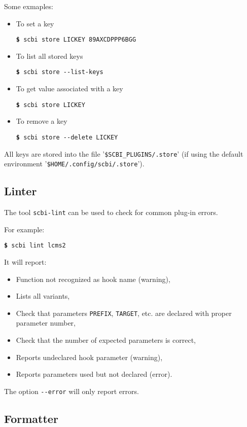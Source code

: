 \documentclass[a4paper,12pt,twoside]{article}
\newcommand{\code}[1]{\texttt{#1}}
\newcommand{\file}[1]{'{\texttt{#1}}'}
\newcommand{\cmd}[1]{\tabto{1cm}\hspace{0.5cm}\texttt{\textbf{\$} #1}}
\newcommand{\ddash}{-{}-}
\begin{document}
Some exmaples:

\begin{itemize}
	\item To set a key

	\cmd{scbi store LICKEY 89AXCDPPP6BGG}

	\item To list all stored keys

	\cmd{scbi store \ddash{}list-keys}

	\item To get value associated with a key

	\cmd{scbi store LICKEY}

	\item To remove a key

    \cmd{scbi store \ddash{}delete LICKEY}
\end{itemize}

All keys are stored into the file \file{\$SCBI\_PLUGINS/.store} (if using the default environment \file{\$HOME/.config/scbi/.store}).

\subsection{Linter}
\label{linter}

The tool \code{scbi-lint} can be used to check for common plug-in errors.

For example:

\cmd{scbi lint lcms2}

It will report:

\begin{itemize}
	\item Function not recognized as hook name (warning),
	\item Lists all variants,
	\item Check that parameters \code{PREFIX}, \code{TARGET}, etc. are declared with proper parameter number,
	\item Check that the number of expected parameters is correct,
	\item Reports undeclared hook parameter (warning),
	\item Reports parameters used but not declared (error).
\end{itemize}

The option \code{\ddash{}error} will only report errors.

\subsection{Formatter}
\label{formatter}
\end{document}
